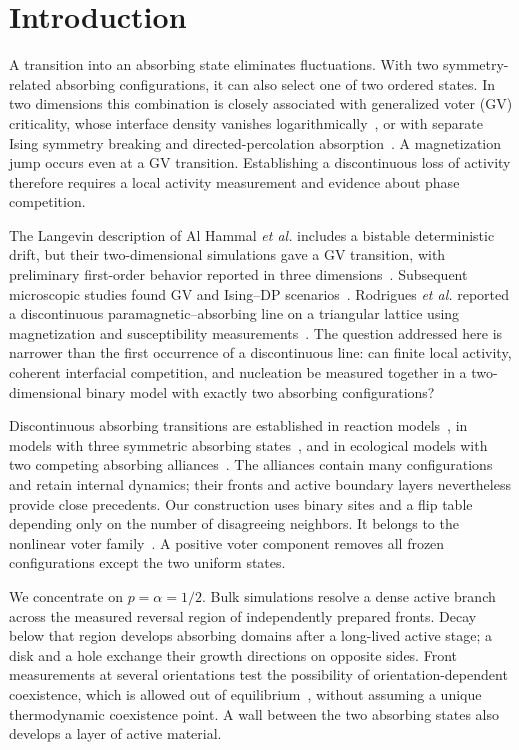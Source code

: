 \section{Introduction}
\label{sec:intro}

A transition into an absorbing state eliminates fluctuations. With two
symmetry-related absorbing configurations, it can also select one of two
ordered states. In two dimensions this combination is closely associated
with generalized voter (GV) criticality, whose interface density vanishes
logarithmically~\cite{dornic2001,clifford1973,holley1975,cox1986,krapivsky1992},
or with separate Ising symmetry breaking and directed-percolation
absorption~\cite{droz2003,alhammal2005,vazquez2008,azizi2020}.
A magnetization jump occurs even at a GV transition. Establishing a
discontinuous loss of activity therefore requires a local activity
measurement and evidence about phase competition.

The Langevin description of Al Hammal \emph{et al.} includes a bistable
deterministic drift, but their two-dimensional simulations gave a GV
transition, with preliminary first-order behavior reported in three
dimensions~\cite{alhammal2005}. Subsequent microscopic studies found GV
and Ising--DP scenarios~\cite{castellano2009,azizi2020}.
Rodrigues \emph{et al.} reported a discontinuous paramagnetic--absorbing
line on a triangular lattice using magnetization and susceptibility
measurements~\cite{rodrigues2015}. The question addressed here is narrower
than the first occurrence of a discontinuous line: can finite local activity,
coherent interfacial competition, and nucleation be measured together in a
two-dimensional binary model with exactly two absorbing configurations?

Discontinuous absorbing transitions are established in reaction
models~\cite{ziff1986,bidaux1989,lubeck2006}, in models with three symmetric
absorbing states~\cite{lipowski2002,azizi2018}, and in ecological models with
two competing absorbing alliances~\cite{szabo2004,guisoni2013}.
The alliances contain many configurations and retain internal dynamics;
their fronts and active boundary layers nevertheless provide close
precedents. Our construction uses binary sites and a flip table depending
only on the number of disagreeing neighbors. It belongs to the nonlinear
voter family~\cite{cox1991,molofsky1999,schweitzer2009}.
A positive voter component removes all frozen configurations except the
two uniform states.

We concentrate on $p=\alpha=1/2$. Bulk simulations resolve a dense active
branch across the measured reversal region of independently prepared
fronts. Decay below that region develops absorbing domains after a
long-lived active stage; a disk and a hole exchange their growth
directions on opposite sides. Front measurements at several orientations
test the possibility of orientation-dependent coexistence, which is allowed
out of equilibrium~\cite{wang2015,liu2018}, without assuming a unique
thermodynamic coexistence point. A wall between the two absorbing states
also develops a layer of active material.

